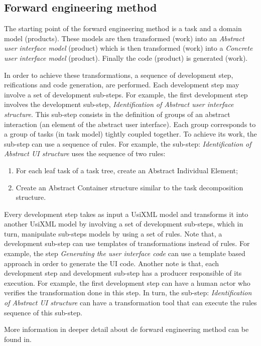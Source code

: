 \subsection{Forward engineering method}
\label{subsection:forward_engineering_method}

The starting point of the forward engineering method is a task and a domain model (products). These models are then transformed (work) into an \textit{Abstract user interface model} (product) which is then transformed (work) into a \textit{Concrete user interface model} (product). Finally the code (product) is generated (work).

In order to achieve these transformations, a sequence of development step, reifications and code generation, are performed. Each development step may involve a set of development sub-steps. For example, the first development step involves the development sub-step, \textit{Identification of Abstract user interface structure}. This sub-step consists in the definition of groups of an abstract interaction (an element of the abstract user interface). Each group corresponds to a group of tasks (in task model) tightly coupled together. To achieve its work, the sub-step can use a sequence of rules. For example, the sub-step: \textit{Identification of Abstract UI structure} uses the sequence of two rules:
\begin{enumerate}
\item For each leaf task of a task tree, create an Abstract Individual Element;
\item Create an Abstract Container structure similar to the task decomposition
structure.
\end{enumerate}
Every development step takes as input a UsiXML model and transforms it into another UsiXML model by involving a set of development sub-steps, which in turn, manipulate sub-steps models by using a set of rules. Note that, a development sub-step can use templates of transformations instead of rules. For example, the step \textit{Generating the user interface code} can use a template based approach in order to generate the UI code. Another note is that, each development step and development sub-step has a producer responsible of its execution. For example, the first development step can have a human actor who verifies the transformation done in this step. In turn, the sub-step: \textit{Identification of Abstract UI structure} can have a transformation tool that can execute the rules sequence of this sub-step.


More information in deeper detail about de forward engineering method can be found in\cite{DBLP:series/hci/LimbourgV09}.
